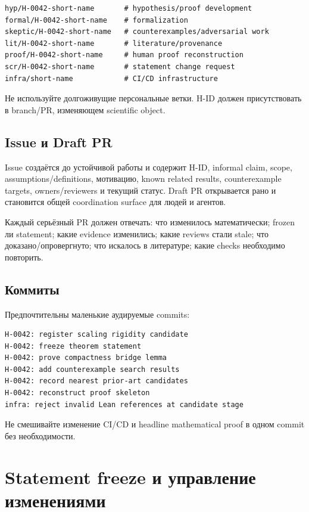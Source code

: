 \documentclass[11pt,a4paper]{article}
\begin{document}
\begin{lstlisting}
hyp/H-0042-short-name       # hypothesis/proof development
formal/H-0042-short-name    # formalization
skeptic/H-0042-short-name   # counterexamples/adversarial work
lit/H-0042-short-name       # literature/provenance
proof/H-0042-short-name     # human proof reconstruction
scr/H-0042-short-name       # statement change request
infra/short-name            # CI/CD infrastructure
\end{lstlisting}

Не используйте долгоживущие персональные ветки. H-ID должен присутствовать в branch/PR, изменяющем scientific object.

\subsection{Issue и Draft PR}

Issue создаётся до устойчивой работы и содержит H-ID, informal claim, scope, assumptions/definitions, мотивацию, known related results, counterexample targets, owners/reviewers и текущий статус. Draft PR открывается рано и становится общей coordination surface для людей и агентов.

Каждый серьёзный PR должен отвечать: что изменилось математически; frozen ли statement; какие evidence изменились; какие reviews стали stale; что доказано/опровергнуто; что искалось в литературе; какие checks необходимо повторить.

\subsection{Коммиты}

Предпочтительны маленькие аудируемые commits:

\begin{lstlisting}
H-0042: register scaling rigidity candidate
H-0042: freeze theorem statement
H-0042: prove compactness bridge lemma
H-0042: add counterexample search results
H-0042: record nearest prior-art candidates
H-0042: reconstruct proof skeleton
infra: reject invalid Lean references at candidate stage
\end{lstlisting}

Не смешивайте изменение CI/CD и headline mathematical proof в одном commit без необходимости.

\section{Statement freeze и управление изменениями}
\end{document}
